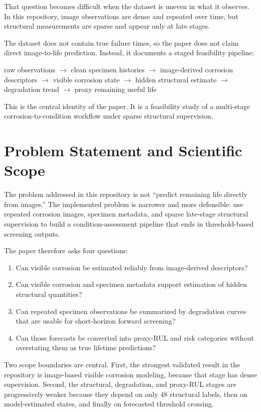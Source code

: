 \documentclass[conference]{IEEEtran}
\begin{document}
That question becomes difficult when the dataset is uneven in what it observes. In this repository, image observations are dense and repeated over time, but structural measurements are sparse and appear only at late stages.

The dataset does not contain true failure times, so the paper does not claim direct image-to-life prediction. Instead, it documents a staged feasibility pipeline:

\begin{center}
raw observations $\rightarrow$ clean specimen histories $\rightarrow$ image-derived corrosion descriptors $\rightarrow$ visible corrosion state $\rightarrow$ hidden structural estimate $\rightarrow$ degradation trend $\rightarrow$ proxy remaining useful life
\end{center}

This is the central identity of the paper. It is a feasibility study of a multi-stage corrosion-to-condition workflow under sparse structural supervision.

\section{Problem Statement and Scientific Scope}
The problem addressed in this repository is not ``predict remaining life directly from images.'' The implemented problem is narrower and more defensible: use repeated corrosion images, specimen metadata, and sparse late-stage structural supervision to build a condition-assessment pipeline that ends in threshold-based screening outputs.

The paper therefore asks four questions:
\begin{enumerate}
    \item Can visible corrosion be estimated reliably from image-derived descriptors?
    \item Can visible corrosion and specimen metadata support estimation of hidden structural quantities?
    \item Can repeated specimen observations be summarized by degradation curves that are usable for short-horizon forward screening?
    \item Can those forecasts be converted into proxy-RUL and risk categories without overstating them as true lifetime predictions?
\end{enumerate}

Two scope boundaries are central. First, the strongest validated result in the repository is image-based visible corrosion modeling, because that stage has dense supervision. Second, the structural, degradation, and proxy-RUL stages are progressively weaker because they depend on only 48 structural labels, then on model-estimated states, and finally on forecasted threshold crossing.
\end{document}

